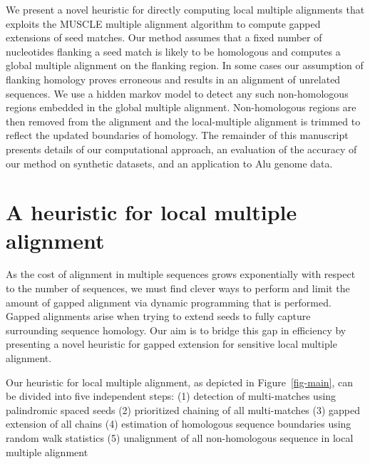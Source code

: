 \documentclass{ws-procs9x6}
\begin{document}
We present a novel heuristic for directly computing local multiple alignments that exploits the MUSCLE multiple alignment algorithm to compute gapped extensions of seed matches.  Our method assumes that a fixed number of nucleotides flanking a seed match is likely to be homologous and computes a global multiple alignment on the flanking region.  In some cases our assumption of flanking homology proves erroneous and results in an alignment of unrelated sequences.  We use a hidden markov model to detect any such non-homologous regions embedded in the global multiple alignment.  Non-homologous regions are then removed from the alignment and the local-multiple alignment is trimmed to reflect the updated boundaries of homology.  The remainder of this manuscript presents details of our computational approach, an evaluation of the accuracy of our method on synthetic datasets, and an application to Alu genome data.



\section{A heuristic for local multiple alignment}
As the cost of alignment in multiple sequences grows exponentially with respect to the number of sequences, we must find clever ways to perform and limit the amount of gapped alignment via dynamic programming that is performed. Gapped alignments arise when trying to extend seeds to fully capture surrounding sequence homology. Our aim is to bridge this gap in efficiency by presenting a novel heuristic for gapped extension for sensitive local multiple alignment.

Our heuristic for local multiple alignment, as depicted in Figure~\ref{fig-main},
can be divided into five independent steps:
(1) detection of multi-matches using palindromic spaced seeds
(2) prioritized chaining of all multi-matches
(3) gapped extension of all chains
(4) estimation of homologous sequence boundaries using random walk statistics
(5) unalignment of all non-homologous sequence in local multiple alignment
\end{document}
